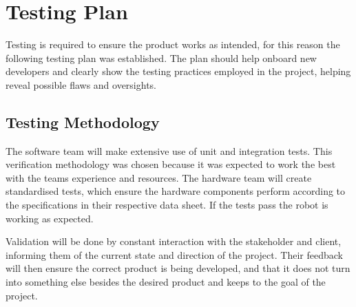 \section{Testing Plan}
\label{section:testing_plan}

Testing is required to ensure the product works as intended, for this reason the following testing plan was established. The plan should help onboard new developers and clearly show the testing practices employed in the project, helping reveal possible flaws and oversights.


\begin{comment}
\helper{General example}
This Testing Plan provides a detailed outline of the testing strategy, approach, and procedures we employ in our project. It establishes a clear pathway for validating and verifying our project's software and hardware components, ensuring they meet the specified requirements. The plan is designed to offer clarity for any team members joining at any project lifecycle stage. Understanding this plan will provide a solid understanding of our testing practices and expectations, aligning with our overall project goals.
\end{comment}

\subsection{Testing Methodology}

The software team will make extensive use of unit and integration tests. This verification methodology was chosen because it was expected to work the best with the teams experience and resources.
The hardware team will create standardised tests, which ensure the hardware components perform according to the specifications in their respective data sheet. If the tests pass the robot is working as expected.

Validation will be done by constant interaction with the stakeholder and client, informing them of the current state and direction of the project. Their feedback will then ensure the correct product is being developed, and that it does not turn into something else besides the desired product and keeps to the goal of the project.

